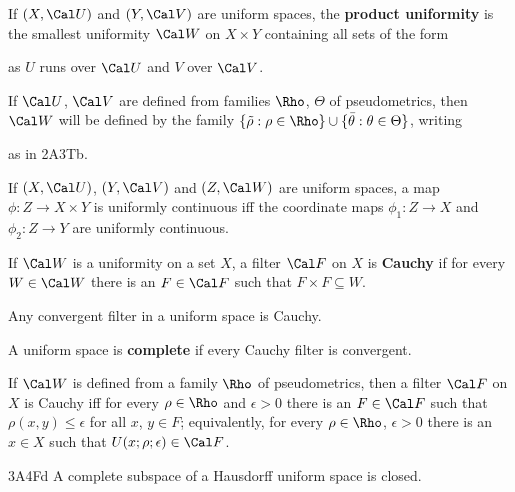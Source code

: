  If $(X,\Cal U)$ and $(Y,\Cal V)$
are uniform spaces, the {\bf product uniformity} is the
smallest uniformity $\Cal W$ on $X\times Y$ containing all sets of the
form


\noindent as $U$ runs over $\Cal U$ and $V$ over $\Cal V$.

 If $\Cal U$, $\Cal V$ are defined from families
$\Rho$, $\Theta$ of pseudometrics, then $\Cal W$ will be defined by the
family $\{\tilde\rho:\rho\in\Rho\}\cup\{\bar\theta:\theta\in\Theta\}$,
writing


\noindent as in 2A3Tb.

 If $(X,\Cal U)$, $(Y,\Cal V)$ and $(Z,\Cal W)$
are uniform spaces, a map $\phi:Z\to X\times Y$ is uniformly continuous
iff the coordinate maps $\phi_1:Z\to X$ and $\phi_2:Z\to Y$ are
uniformly continuous.

 If $\Cal W$ is a uniformity on a set
$X$, a filter $\Cal F$ on $X$ is {\bf Cauchy} if for every $W\in\Cal W$
there is an $F\in\Cal F$ such that $F\times F\subseteq W$.

Any convergent filter in a uniform space is Cauchy.

 A uniform space is {\bf complete} if every
Cauchy filter is convergent.

 If $\Cal W$ is defined from a family $\Rho$ of
pseudometrics, then a
filter $\Cal F$ on $X$ is Cauchy iff for every $\rho\in\Rho$ and
$\epsilon>0$ there is an $F\in\Cal F$ such that $\rho(x,y)\le\epsilon$
for all $x$, $y\in F$;  equivalently, for every $\rho\in\Rho$,
$\epsilon>0$ there is an $x\in X$ such that
$U(x;\rho;\epsilon)\in\Cal F$.   

\spheader 3A4Fd A complete subspace of a Hausdorff uniform space is
closed.

